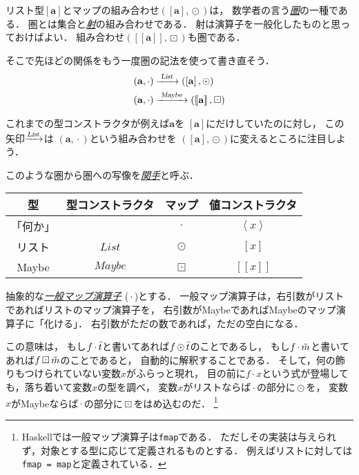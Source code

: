 \documentclass[a5paper,draft]{jsbook}
\def\[{\left[\!\left[}
\def\]{\right]\!\right]}
\newcommand{\programminglanguage}[1]{\textsf{#1}}
\newcommand{\haskell}{\programminglanguage{Haskell}}
\newcommand{\keyword}[1]{{\underline{\emph{#1}}}}
\newcommand{\code}[1]{\texttt{#1}}
\newcommand{\mathTypeParameter}[1]{\mathbf{#1}}
\newcommand{\mathFunctor}[1]{\mathop{\textsl{#1}}} %
\newcommand{\mathTypeConstructor}[1]{\mathit{#1}} %
\newcommand{\mathListWith}[1]{\left[#1\right]}
\newcommand{\mathTupleWith}[1]{\left(#1\right)}
\newcommand{\mathMaybeWith}[1]{\[#1\]}
\newcommand{\mathPureWith}[1]{\left\langle#1\right\rangle}
\newcommand{\mathListType}[1]{\left[#1\right]}
\newcommand{\mathMaybeType}[1]{\[#1\]}
\newcommand{\mathListVar}[1]{\Bar{#1}}
\newcommand{\mathMaybeVar}[1]{\Tilde{#1}}
\DeclareMathOperator{\mathList}{\mathTypeConstructor{List}}
\DeclareMathOperator{\mathMaybe}{\mathTypeConstructor{Maybe}}
\newcommand{\mathBinaryOperator}[1]{\operatorname{#1}}
\newcommand{\mathGeneralMap}{\mathBinaryOperator{\cdot}}
\newcommand{\mathMap}{\mathBinaryOperator{\odot}}
\newcommand{\mathMaybeMap}{\mathBinaryOperator{\boxdot}}
\begin{document}
リスト型$\mathListType{\mathTypeParameter{a}}$とマップの組み合わせ$\mathTupleWith{\mathListType{\mathTypeParameter{a}},\mathMap}$は，
数学者の言う\keyword{圏}の一種である．
圏とは集合と\keyword{射}の組み合わせである．
射は演算子を一般化したものと思っておけばよい．
組み合わせ$\mathTupleWith{\mathMaybeType{\mathTypeParameter{a}},\mathMaybeMap}$も圏である．

そこで先ほどの関係をもう一度圏の記法を使って書き直そう．
\begin{align}
\mathTupleWith{\mathTypeParameter{a},\mathGeneralMap}
&\xrightarrow{\;\mathFunctor{List}\;}\mathTupleWith{\mathListType{\mathTypeParameter{a}},\mathMap}\\
\mathTupleWith{\mathTypeParameter{a},\mathGeneralMap}
&\xrightarrow{\;\mathFunctor{Maybe}\;}\mathTupleWith{\mathMaybeType{\mathTypeParameter{a}},\mathMaybeMap}
\end{align}

これまでの型コンストラクタが例えば$\mathTypeParameter{a}$を
$\mathListType{\mathTypeParameter{a}}$にだけしていたのに対し，
この矢印$\xrightarrow{\mathFunctor{List}}$は
$\mathTupleWith{\mathTypeParameter{a},\mathGeneralMap}$という組み合わせを
$\mathTupleWith{\mathListType{\mathTypeParameter{a}},\mathMap}$に変えるところに注目しよう．

このような圏から圏への写像を\keyword{関手}と呼ぶ．

\begin{table}
\begin{center}
\begin{tabular}{||c|c|c|c||}\hline
型&型コンストラクタ&マップ&値コンストラクタ\\\hline\hline
「何か」&&$\mathGeneralMap$&$\mathPureWith{x}$\\
リスト&$\mathList$&$\mathMap$&$\mathListWith{x}$\\
Maybe&$\mathMaybe$&$\mathMaybeMap$&$\mathMaybeWith{x}$\\\hline
\end{tabular}
\end{center}
\end{table}



抽象的な\keyword{一般マップ演算子} ($\mathGeneralMap$)とする．
一般マップ演算子は，右引数がリストであればリストのマップ演算子を，
右引数がMaybeであればMaybeのマップ演算子に「化ける」．
右引数がただの数であれば，ただの空白になる．

この意味は，
もし$f\mathGeneralMap\mathListVar{t}$と書いてあれば$f\mathMap\mathListVar{t}$のことであるし，
もし$f\mathGeneralMap\mathMaybeVar{m}$と書いてあれば$f\mathMaybeMap\mathMaybeVar{m}$のことであると，
自動的に解釈することである．
そして，何の飾りもつけられていない変数$x$がふらっと現れ，
目の前に$f\mathGeneralMap x$という式が登場しても，落ち着いて変数$x$の型を調べ，
変数$x$がリストならば$\mathGeneralMap$の部分に$\mathMap$を，
変数$x$がMaybeならば$\mathGeneralMap$の部分に$\mathMaybeMap$をはめ込むのだ．%
\footnote{\haskell では一般マップ演算子は\code{fmap}である．
ただしその実装は与えられず，対象とする型に応じて定義されるものとする．
例えばリストに対しては\code{fmap = map}と定義されている．}
\end{document}
